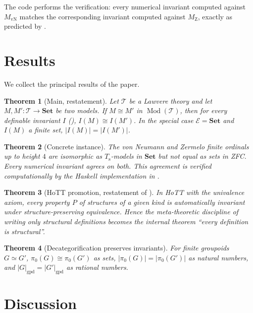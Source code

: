 \documentclass[12pt]{article}
\newtheorem{theorem}{Theorem}[section]
\theoremstyle{definition}
\theoremstyle{remark}
\newcommand{\Set}{\mathbf{Set}}
\newcommand{\T}{\mathcal{T}}
\newcommand{\E}{\mathcal{E}}
\newcommand{\Mod}[1]{\operatorname{Mod}(#1)}
\newcommand{\eq}{\simeq}
\newcommand{\iso}{\cong}
\newcommand{\succop}{\mathrm{s}}
\begin{document}
\noindent The code performs the verification: every numerical invariant computed against $M_{\mathrm{vN}}$ matches the corresponding invariant computed against $M_{\mathrm{Z}}$, exactly as predicted by .

\section{Results}\label{sec:results}

We collect the principal results of the paper.

\begin{theorem}[Main, restatement]
Let $\T$ be a Lawvere theory and let $M, M' : \T \to \Set$ be two models. If $M \iso M'$ in $\Mod{\T}$, then for every definable invariant $I$ (), $I(M) \iso I(M')$. In the special case $\E = \Set$ and $I(M)$ a finite set, $|I(M)| = |I(M')|$.
\end{theorem}

\begin{theorem}[Concrete instance]
The von Neumann and Zermelo finite ordinals up to height $4$ are isomorphic as $T_\succop$-models in $\Set$ but not equal as sets in ZFC. Every numerical invariant agrees on both. This agreement is verified computationally by the Haskell implementation in .
\end{theorem}

\begin{theorem}[HoTT promotion, restatement of ]
In HoTT with the univalence axiom, every property $P$ of structures of a given kind is automatically invariant under structure-preserving equivalence. Hence the meta-theoretic discipline of writing only structural definitions becomes the internal theorem ``every definition is structural''.
\end{theorem}

\begin{theorem}[Decategorification preserves invariants]
For finite groupoids $G \eq G'$, $\pi_0(G) \iso \pi_0(G')$ as sets, $|\pi_0(G)| = |\pi_0(G')|$ as natural numbers, and $|G|_{\mathrm{gpd}} = |G'|_{\mathrm{gpd}}$ as rational numbers.
\end{theorem}

\section{Discussion}\label{sec:discussion}
\end{document}
